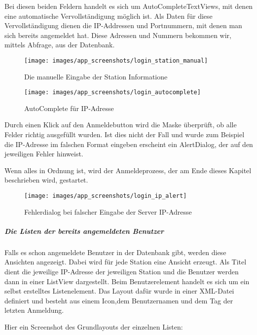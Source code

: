 \begin{itemize}
Bei diesen beiden Feldern handelt es sich um AutoCompleteTextViews, mit denen eine automatische Vervollständigung möglich ist. Als Daten für diese Vervollständigung dienen die IP-Addressen und Portnummern, mit denen man sich bereits angemeldet hat. Diese Adressen und Nummern bekommen wir, mittels Abfrage, aus der Datenbank.


\begin{figure}[H]
  \centering
  \begin{minipage}[t]{7 cm}
  	\centering
  	\texttt{[image: images/app\_screenshots/login\_station\_manual]} 
    \caption{Die manuelle Eingabe der Station Informatione}
  \end{minipage}
  \hspace{0.5cm}
  \begin{minipage}[t]{7 cm}
	\centering
	\texttt{[image: images/app\_screenshots/login\_autocomplete]}  
    \caption{AutoComplete für IP-Adresse}
  \end{minipage}
\end{figure}




\end{itemize}

Durch einen Klick auf den Anmeldebutton wird die Maske überprüft, ob alle Felder richtig ausgefüllt wurden. Ist dies nicht der Fall und wurde zum Beispiel die IP-Adresse im falschen Format eingeben erscheint ein AlertDialog, der auf den jeweiligen Fehler hinweist. 

Wenn alles in Ordnung ist, wird der Anmeldeprozess, der am Ende dieses Kapitel beschrieben wird, gestartet.

\begin{figure}[H]
\centering
\texttt{[image: images/app\_screenshots/login\_ip\_alert]}
\caption{Fehlerdialog bei falscher Eingabe der Server IP-Adresse}
\end{figure}

\subparagraph{Die Listen der bereits angemeldeten Benutzer}
Falls es schon angemeldete Benutzer in der Datenbank gibt, werden diese Ansichten angezeigt. Dabei wird für jede Station eine Ansicht erzeugt. Als Titel dient die jeweilige IP-Adresse der jeweiligen Station und die Benutzer werden dann in einer ListView dargestellt. Beim Benutzerelement handelt es sich um ein selbst erstelltes Listenelement. Das Layout dafür wurde in einer XML-Datei definiert und besteht aus einem Icon,dem Benutzernamen und dem Tag der letzten Anmeldung. 

Hier ein Screenshot des Grundlayouts der einzelnen Listen:



